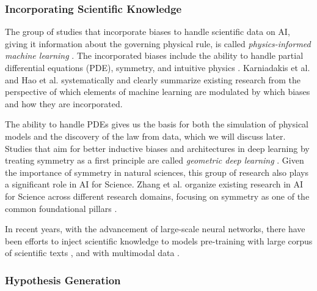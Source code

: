 \documentclass{article}
\begin{document}

\subsubsection{Incorporating Scientific Knowledge}

The group of studies that incorporate biases to handle scientific data on AI, giving it information about the governing physical rule, is called \textit{physics-informed machine learning} \cite{karniadakis2021physics}. The incorporated biases include the ability to handle partial differential equations (PDE), symmetry, and intuitive physics \cite{hao2022physics}. Karniadakis et al. \cite{karniadakis2021physics} and Hao et al. \cite{hao2022physics} systematically and clearly summarize existing research from the perspective of which elements of machine learning are modulated by which biases and how they are incorporated. %

The ability to handle PDEs gives us the basis for both the simulation of physical models and the discovery of the law from data, which we will discuss later. Studies that aim for better inductive biases and architectures in deep learning by treating symmetry as a first principle are called \textit{geometric deep learning} \cite{bronstein2021geometric}. Given the importance of symmetry in natural sciences, this group of research also plays a significant role in AI for Science. Zhang et al.  organize existing research in AI for Science across different research domains, focusing on symmetry as one of the common foundational pillars \cite{zhang2023artificial}.

In recent years, with the advancement of large-scale neural networks, there have been efforts to inject scientific knowledge to models pre-training with large corpus of scientific texts \cite{taylor2022galactica,beltagy2019scibert}, and with multimodal data \cite{singhal2023towards}.

\subsubsection{Hypothesis Generation}
\end{document}
